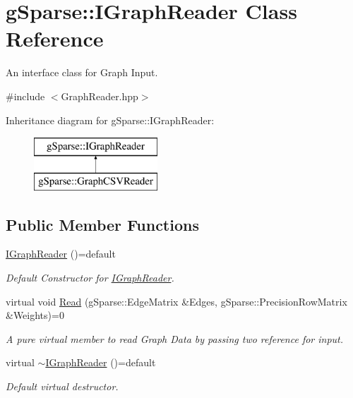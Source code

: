 \hypertarget{classg_sparse_1_1_i_graph_reader}{}\section{g\+Sparse\+:\+:I\+Graph\+Reader Class Reference}
\label{classg_sparse_1_1_i_graph_reader}


An interface class for Graph Input.  




{\ttfamily \#include $<$Graph\+Reader.\+hpp$>$}

Inheritance diagram for g\+Sparse\+:\+:I\+Graph\+Reader\+:\begin{figure}[H]
\begin{center}
\leavevmode
\includegraphics[height=2.000000cm]{classg_sparse_1_1_i_graph_reader}
\end{center}
\end{figure}
\subsection*{Public Member Functions}
\begin{DoxyCompactItemize}
\item 
\mbox{\label{classg_sparse_1_1_i_graph_reader_adc903c78e5b76aebca391b2b07ec81d7}} 
\mbox{\hyperlink{classg_sparse_1_1_i_graph_reader_adc903c78e5b76aebca391b2b07ec81d7}{I\+Graph\+Reader}} ()=default
\begin{DoxyCompactList}\small\item\em Default Constructor for \mbox{\hyperlink{classg_sparse_1_1_i_graph_reader}{I\+Graph\+Reader}}. \end{DoxyCompactList}\item 
virtual void \mbox{\hyperlink{classg_sparse_1_1_i_graph_reader_a42885505f5bdb8136b0d5b386925d1c7}{Read}} (g\+Sparse\+::\+Edge\+Matrix \&Edges, g\+Sparse\+::\+Precision\+Row\+Matrix \&Weights)=0
\begin{DoxyCompactList}\small\item\em A pure virtual member to read Graph Data by passing two reference for input. \end{DoxyCompactList}\item 
\mbox{\label{classg_sparse_1_1_i_graph_reader_a03a04fad2268a001b23bcafb5391b894}} 
virtual \mbox{\hyperlink{classg_sparse_1_1_i_graph_reader_a03a04fad2268a001b23bcafb5391b894}{$\sim$\+I\+Graph\+Reader}} ()=default
\begin{DoxyCompactList}\small\item\em Default virtual destructor. \end{DoxyCompactList}\end{DoxyCompactItemize}


